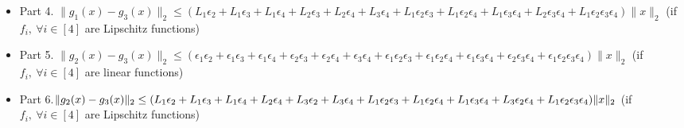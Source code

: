 \begin{lemma}
\begin{itemize}
    \item Part 4. $\| g_1 (x) - g_3 (x ) \|_2 \leq (L_1 \epsilon_2  + L_1 \epsilon_3  +L_1 \epsilon_4   +
        L_2 \epsilon_3  + L_2  \epsilon_4  + L_3  \epsilon_4  +
        L_1 \epsilon_2 \epsilon_3  +L_1 \epsilon_2 \epsilon_4   +L_1 \epsilon_3 \epsilon_4 +
        L_2 \epsilon_3 \epsilon_4  +
        L_1 \epsilon_2 \epsilon_3 \epsilon_4)  \|x \|_2   $ (if $f_i,~\forall i \in [4]$ are Lipschitz functions)
    \item Part 5. $\| g_2 (x) - g_3 (x ) \|_2\leq ( \epsilon_1 \epsilon_2+ \epsilon_1 \epsilon_3 + \epsilon_1 \epsilon_4
        +\epsilon_2\epsilon_3+ \epsilon_2 \epsilon_4
        +\epsilon_3 \epsilon_4 
         + \epsilon_1 \epsilon_2 \epsilon_3 + \epsilon_1 \epsilon_2 \epsilon_4 + \epsilon_1 \epsilon_3 \epsilon_4 +\epsilon_2 \epsilon_3 \epsilon_4 + \epsilon_1 \epsilon_2 \epsilon_3 \epsilon_4) \|x\|_2$ (if $f_i,~\forall i \in [4]$ are linear functions)
    \item Part 6.$\| g_2 (x) - g_3 (x ) \|_2\leq  (L_1 \epsilon_2 + L_1 \epsilon_3 + L_1 \epsilon_4 +
        L_2 \epsilon_4+
        L_3 \epsilon_2 + L_3 \epsilon_4+
        L_1 \epsilon_2 \epsilon_3 + L_1 \epsilon_2 \epsilon_4 + L_1 \epsilon_3 \epsilon_4+
        L_3 \epsilon_2 \epsilon_4+
        L_1  \epsilon_2 \epsilon_3 \epsilon_4) \| x\|_2\\$ (if $f_i,~\forall i \in [4]$ are Lipschitz functions)
\end{itemize}
\end{lemma}
